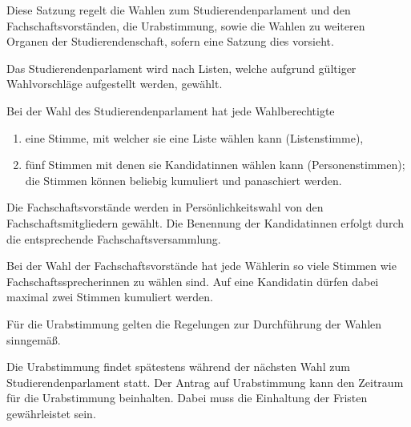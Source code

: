 

\begin{jurdoc}

\label{wahl:geltungsbereich}
Diese Satzung regelt die Wahlen zum Studierendenparlament und den Fachschaftsvorständen, die Urabstimmung, sowie die Wahlen zu weiteren Organen der Studierendenschaft, sofern eine Satzung dies vorsieht.

\label{wahl:wahlsystem}
Das Studierendenparlament wird nach Listen, welche aufgrund gültiger Wahlvorschläge aufgestellt werden, gewählt.

Bei der Wahl des Studierendenparlament hat jede Wahlberechtigte
\begin{enumerate}
    \item eine Stimme, mit welcher sie eine Liste wählen kann (Listenstimme),
    \item fünf Stimmen mit denen sie Kandidatinnen wählen kann (Personenstimmen); die Stimmen können beliebig kumuliert und panaschiert werden.
\end{enumerate}

Die Fachschaftsvorstände werden in Persönlichkeitswahl von den Fachschaftsmitgliedern gewählt. Die Benennung der Kandidatinnen erfolgt durch die entsprechende Fachschaftsversammlung.

Bei der Wahl der Fachschaftsvorstände hat jede Wählerin so viele Stimmen wie Fachschaftssprecherinnen zu wählen sind. Auf eine Kandidatin dürfen dabei maximal zwei Stimmen kumuliert werden.

\label{wahl:urabstimmung}
Für die Urabstimmung gelten die Regelungen zur Durchführung der Wahlen sinngemäß.

Die Urabstimmung findet spätestens während der nächsten Wahl zum Studierendenparlament statt. Der Antrag auf Urabstimmung kann den Zeitraum für die Urabstimmung beinhalten. Dabei muss die Einhaltung der Fristen gewährleistet sein.

\label{wahl:wahlberechtigung}


\end{jurdoc}
